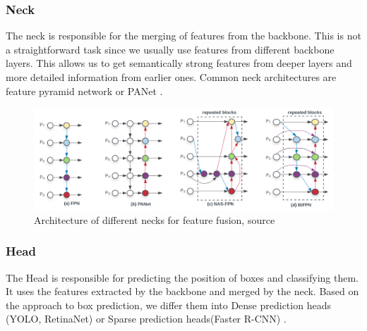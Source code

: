 \subsubsection{Neck}
The neck is responsible for the merging of features from the backbone. This is not a straightforward task since we usually use features from different backbone layers. This allows us to get semantically strong features from deeper layers and more detailed information from earlier ones. Common neck architectures are feature pyramid network or PANet \cite{Lin_2017_CVPR}.
\begin{figure}
    \centering
    \includegraphics[width=\linewidth]{images/necks_architecture.png}
    \caption{Architecture of different necks for feature fusion, source \cite{Tan2019}}
    \label{fig:necks}
\end{figure}

\subsubsection{Head}
The Head is responsible for predicting the position of boxes and classifying them. It uses the features extracted by the backbone and merged by the neck. Based on the approach to box prediction, we differ them into Dense prediction heads (YOLO, RetinaNet) or Sparse prediction heads(Faster R-CNN) \cite{Bochkovskiy2020}.


